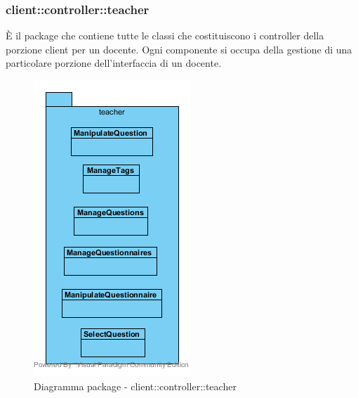 \subsubsection{client::controller::teacher}
È il package che contiene tutte le classi che costituiscono i controller della porzione client per un docente. Ogni componente si occupa della gestione di una particolare porzione dell'interfaccia di un docente.\begin{center}
	\begin{figure}[H]
		\centering \includegraphics[scale=4, max width=\textwidth, max height=\myheight]{../img/diagrammiClassi/client/controller/teacher.png}
		\caption{Diagramma package - client::controller::teacher}
	\end{figure}
\end{center}\hypertarget{client::controller::teacher::ManipulateQuestion}{}
